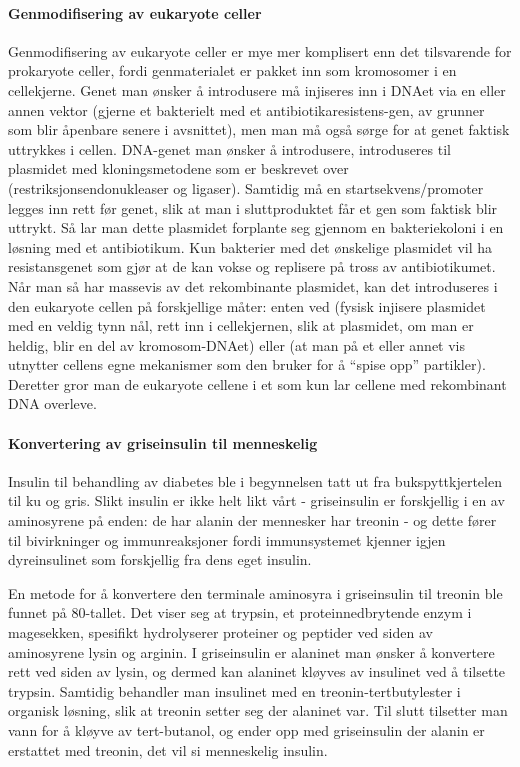 \paragraph{Genmodifisering av eukaryote celler} Genmodifisering av eukaryote celler er mye mer komplisert enn det tilsvarende for prokaryote celler, fordi genmaterialet er pakket inn som kromosomer i en cellekjerne. Genet man ønsker å introdusere må injiseres inn i DNAet via en eller annen vektor (gjerne et bakterielt  med et antibiotikaresistens-gen, av grunner som blir åpenbare senere i avsnittet), men man må også sørge for at genet faktisk uttrykkes i cellen. DNA-genet man ønsker å introdusere, introduseres til plasmidet med kloningsmetodene som er beskrevet over (restriksjonsendonukleaser og ligaser). Samtidig må en startsekvens/promoter legges inn rett før genet, slik at man i sluttproduktet får et gen som faktisk blir uttrykt. Så lar man dette plasmidet forplante seg gjennom en bakteriekoloni i en løsning med et antibiotikum. Kun bakterier med det ønskelige plasmidet vil ha resistansgenet som gjør at de kan vokse og replisere på tross av antibiotikumet. Når man så har massevis av det rekombinante plasmidet, kan det introduseres i den eukaryote cellen på forskjellige måter: enten ved  (fysisk injisere plasmidet med en veldig tynn nål, rett inn i cellekjernen, slik at plasmidet, om man er heldig, blir en del av kromosom-DNAet) eller  (at man på et eller annet vis utnytter cellens egne mekanismer som den bruker for å ``spise opp'' partikler). Deretter gror man de eukaryote cellene i et  som kun lar cellene med rekombinant DNA overleve.


\paragraph{Konvertering av griseinsulin til menneskelig } Insulin til behandling av diabetes ble i begynnelsen tatt ut fra bukspyttkjertelen til ku og gris. Slikt insulin er ikke helt likt vårt - griseinsulin er forskjellig i en av aminosyrene på enden: de har alanin der mennesker har treonin - og dette fører til bivirkninger og immunreaksjoner fordi immunsystemet kjenner igjen dyreinsulinet som forskjellig fra dens eget insulin.

En metode for å konvertere den terminale aminosyra i griseinsulin til treonin ble funnet på 80-tallet. Det viser seg at trypsin, et proteinnedbrytende enzym i magesekken, spesifikt hydrolyserer proteiner og peptider ved siden av aminosyrene lysin og arginin. I griseinsulin er alaninet man ønsker å konvertere rett ved siden av lysin, og dermed kan alaninet kløyves av insulinet ved å tilsette trypsin. Samtidig behandler man insulinet med en treonin-tertbutylester i organisk løsning, slik at treonin setter seg der alaninet var. Til slutt tilsetter man vann for å kløyve av tert-butanol, og ender opp med griseinsulin der alanin er erstattet med treonin, det vil si menneskelig insulin.

